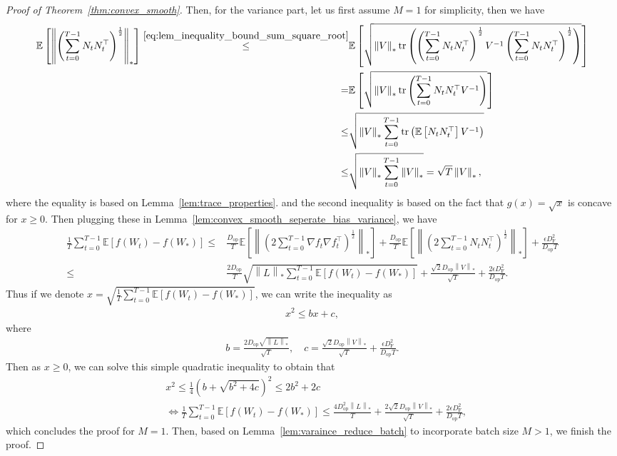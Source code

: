 \documentclass{article}
\theoremstyle{remark}
\newcommand{\Norm}[1]{\left\|#1\right\|}
\newcommand{\tr}[1]{{\rm tr}\left( #1 \right)}
\newcommand{\EE}{\mathbb{E}}
\begin{document}
\begin{proof}[Proof of Theorem~\ref{thm:convex_smooth}]
    Then, for the variance part, let us first assume $M=1$ for simplicity, then we have
    \begin{align*}
        \EE\left[ \Norm{\left( \sum_{t=0}^{T-1} N_tN_t^\top\right)^{\frac{1}{2}}}_* \right] \overset{\eqref{eq:lem_inequality_bound_sum_square_root}}{\le}& \EE\left[ \sqrt{\Norm{V}_* \tr{\left( \sum_{t=0}^{T-1} N_tN_t^\top \right)^{\frac{1}{2}} V^{-1} \left( \sum_{t=0}^{T-1} N_tN_t^\top \right)^{\frac{1}{2}}}} \right] \\
        =&
        \EE\left[ \sqrt{\Norm{V}_* \tr{ \sum_{t=0}^{T-1} N_tN_t^\top V^{-1} }} \right] \\
        \le&
        \sqrt{\Norm{V}_* \sum_{t=0}^{T-1} \tr{ \EE\left[ N_tN_t^\top \right] V^{-1} }} \\
        \le&
        \sqrt{\Norm{V}_* \sum_{t=0}^{T-1} \Norm{V}_*} = \sqrt{T} \Norm{V}_*,
    \end{align*}
    where the equality is based on Lemma~\ref{lem:trace_properties}. and the second inequality is based on the fact that $g(x) = \sqrt{x}$ is concave for $x \ge 0$.
    Then plugging these in Lemma~\ref{lem:convex_smooth_seperate_bias_variance}, we have
    \begin{align*}
        \frac{1}{T} \sum_{t=0}^{T-1} \EE[f(W_t) - f(W_*)]
        \le&
        \frac{D_{\mathrm{op}}}{T} \EE\left[ \Norm{\left( 2\sum_{t=0}^{T-1} \nabla f_t \nabla f_t^\top \right)^{\frac{1}{2}}}_* \right] + \frac{D_{\mathrm{op}}}{T} \EE\left[ \Norm{\left( 2\sum_{t=0}^{T-1} N_tN_t^\top\right)^{\frac{1}{2}}}_* \right] + \frac{\epsilon D_{\mathrm{F}}^2}{D_{\mathrm{op}} T} \\
        \le&
        \frac{2 D_{\mathrm{op}}}{T} \sqrt{\Norm{L}_* \sum_{t=0}^{T-1} \EE[f(W_t) - f(W_*)]} + \frac{\sqrt{2} D_{\mathrm{op}} \Norm{V}_*}{\sqrt{T}} + \frac{2\epsilon D_{\mathrm{F}}^2}{D_{\mathrm{op}} T}.
    \end{align*}
    Thus if we denote $x = \sqrt{\frac{1}{T} \sum_{t=0}^{T-1} \EE[f(W_t) - f(W_*)]}$, we can write the inequality as
    \begin{align*}
        x^2 \le b x + c ,
    \end{align*}
    where
    \begin{align*}
        b = \frac{2D_{\mathrm{op}} \sqrt{\Norm{L}_*}}{\sqrt{T}}, \quad c = \frac{\sqrt{2} D_{\mathrm{op}} \Norm{V}_*}{\sqrt{T}} + \frac{\epsilon D_{\mathrm{F}}^2}{D_{\mathrm{op}} T} .
    \end{align*}
    Then as $x \ge 0$, we can solve this simple quadratic inequality to obtain that
    \begin{align*}
        & x^2 \le \frac{1}{4} \left( b + \sqrt{b^2 + 4c} \right)^2 \le 2b^2 + 2c \\
        & \Longleftrightarrow \frac{1}{T} \sum_{t=0}^{T-1} \EE[f(W_t) - f(W_*)] \le \frac{4D_{\mathrm{op}}^2 \Norm{L}_*}{T} + \frac{2\sqrt{2} D_{\mathrm{op}} \Norm{V}_*}{\sqrt{T}} + \frac{2\epsilon D_{\mathrm{F}}^2}{D_{\mathrm{op}} T} ,
    \end{align*}
    which concludes the proof for $M=1$. Then, based on Lemma~\ref{lem:varaince_reduce_batch} to incorporate batch size $M>1$, we finish the proof.
\end{proof}
\end{document}
